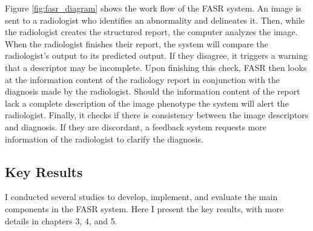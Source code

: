 Figure \ref{fig:fasr_diagram} shows the work flow of the FASR system. An image is sent to a radiologist who identifies an abnormality and delineates it. Then, while the radiologist creates the structured report, the computer analyzes the image. When the radiologist finishes their report, the system will compare the radiologist's output to its predicted output. If they disagree, it triggers a warning that a descriptor may be incomplete. Upon finishing this check, FASR then looks at the information content of the radiology report in conjunction with the diagnosis made by the radiologist. Should the information content of the report lack a complete description of the image phenotype the system will alert the radiologist. Finally, it checks if there is consistency between the image descriptors and diagnosis. If they are discordant, a feedback system requests more information of the radiologist to clarify the diagnosis.

\subsection{Key Results}

I conducted several studies to develop, implement, and evaluate the main components in the FASR system. Here I present the key results, with more details in chapters 3, 4, and 5. 

